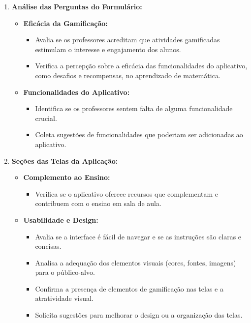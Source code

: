 \begin{enumerate}
    \item \textbf{Análise das Perguntas do Formulário:}
    \begin{itemize}
        \item \textbf{Eficácia da Gamificação:}
        \begin{itemize}
            \item Avalia se os professores acreditam que atividades gamificadas estimulam o interesse e engajamento dos alunos.
            \item Verifica a percepção sobre a eficácia das funcionalidades do aplicativo, como desafios e recompensas, no aprendizado de matemática.
        \end{itemize}
        \item \textbf{Funcionalidades do Aplicativo:}
        \begin{itemize}
            \item Identifica se os professores sentem falta de alguma funcionalidade crucial.
            \item Coleta sugestões de funcionalidades que poderiam ser adicionadas ao aplicativo.
        \end{itemize}
    \end{itemize}
    \item \textbf{Seções das Telas da Aplicação:}
    \begin{itemize}
        \item \textbf{Complemento ao Ensino:}
        \begin{itemize}
            \item Verifica se o aplicativo oferece recursos que complementam e contribuem com o ensino em sala de aula.
        \end{itemize}
        \item \textbf{Usabilidade e Design:}
        \begin{itemize}
            \item Avalia se a interface é fácil de navegar e se as instruções são claras e concisas.
            \item Analisa a adequação dos elementos visuais (cores, fontes, imagens) para o público-alvo.
            \item Confirma a presença de elementos de gamificação nas telas e a atratividade visual.
            \item Solicita sugestões para melhorar o design ou a organização das telas.
        \end{itemize}

\end{itemize}
\end{enumerate}
